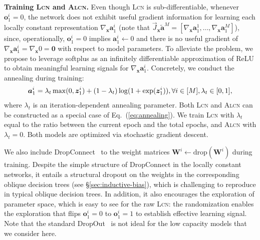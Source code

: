 \documentclass{article} \usepackage{iclr2020_conference,times}
\def\vzero{{\bm{0}}}
\def\va{{\bm{a}}}
\def\vo{{\bm{o}}}
\def\vx{{\bm{x}}}
\def\vz{{\bm{z}}}
\def\mW{{\bm{W}}}
\newcommand{\xref}[1]{\S\ref{#1}}
\begin{document}
\textbf{Training \textsc{Lcn} and \textsc{Alcn}.} Even though \textsc{Lcn} is sub-differentiable, whenever $\vo^i_1 = 0$, the network does not exhibit useful gradient information for learning each locally constant representation $\nabla_\vx \va^i_1$ (note that $\vec{J}_\vx \tilde \va^M = [\nabla_\vx \va^1_1,\dots,\nabla_\vx \va^M_1]$), since, operationally, $\vo^i_1 = 0$ implies $\va^i_1 \gets 0$ and there is no useful gradient of $\nabla_\vx \va^i_1 = \nabla_\vx 0 = \vzero$ with respect to model parameters. To alleviate the problem, we propose to leverage softplus as an infinitely differentiable approximation of ReLU to obtain meaningful learning signals for $\nabla_\vx \va^i_1$. Concretely, we conduct the annealing during training:
\begin{align}
\vspace{-2mm}
    \va^i_1 = \lambda_t \max(0, \vz^i_1) + (1-\lambda_t) \log (1 + \exp(\vz^i_1)), \forall i \in [M], \lambda_t \in [0, 1], \label{eq:annealing}
\vspace{-2mm}
\end{align}
where $\lambda_t$ is an iteration-dependent annealing parameter. Both \textsc{Lcn} and \textsc{Alcn} can be constructed as a special case of Eq.~(\ref{eq:annealing}). We train \textsc{Lcn} with $\lambda_t$ equal to the ratio between the current epoch and the total epochs, and \textsc{Alcn} with $\lambda_t = 0$. Both models are optimized via stochastic gradient descent. 

We also include DropConnect~\citep{wan2013regularization} to the weight matrices $\mW^i \gets \text{drop}(\mW^i)$ during training. Despite the simple structure of DropConnect in the locally constant networks, it entails a structural dropout on the weights in the corresponding oblique decision trees (see \xref{sec:inductive-bias}), which is challenging to reproduce in typical oblique decision trees. In addition, it also encourages the exploration of parameter space, which is easy to see for the raw \textsc{Lcn}: the randomization enables the exploration that flips $\vo^i_1 = 0$ to $\vo^i_1 = 1$ to establish effective learning signal. Note that the standard DropOut~\citep{srivastava2014dropout} is not ideal for the low capacity models that we consider here. 
\end{document}
